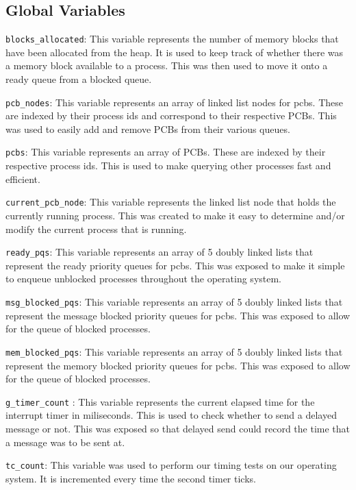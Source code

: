 \documentclass[se]{uw-wkrpt}
\begin{document}
\appendix
\begin{appendices}

\section{Global Variables}

\texttt{blocks\_allocated}: This variable represents the number of memory blocks that have been allocated from the heap. It is used to keep track of whether there was a memory block available to a process. This was then used to move it onto a ready queue from a blocked queue.

\texttt{pcb\_nodes}: This variable represents an array of linked list nodes for pcbs. These are indexed by their process ids and correspond to their respective PCBs. This was used to easily add and remove PCBs from their various queues.

\texttt{pcbs}: This variable represents an array of PCBs. These are indexed by their respective process ids. This is used to make querying other processes fast and efficient.

\texttt{current\_pcb\_node}: This variable represents the linked list node that holds the currently running process. This was created to make it easy to determine and/or modify the current process that is running.

\texttt{ready\_pqs}: This variable represents an array of 5 doubly linked lists that represent the ready priority queues for pcbs. This was exposed to make it simple to enqueue unblocked processes throughout the operating system.

\texttt{msg\_blocked\_pqs}: This variable represents an array of 5 doubly linked lists that represent the message blocked priority queues for pcbs. This was exposed to allow for the queue of blocked processes.

\texttt{mem\_blocked\_pqs}: This variable represents an array of 5 doubly linked lists that represent the memory blocked priority queues for pcbs. This was exposed to allow for the queue of blocked processes.

\texttt{g\_timer\_count} \label{g_timer_count}: This variable represents the current elapsed time for the interrupt timer in miliseconds. This is used to check whether to send a delayed message or not. This was exposed so that delayed send could record the time that a message was to be sent at.

\texttt{tc\_count}: This variable was used to perform our timing tests on our operating system. It is incremented every time the second timer ticks.

\end{appendices}
\end{document}
